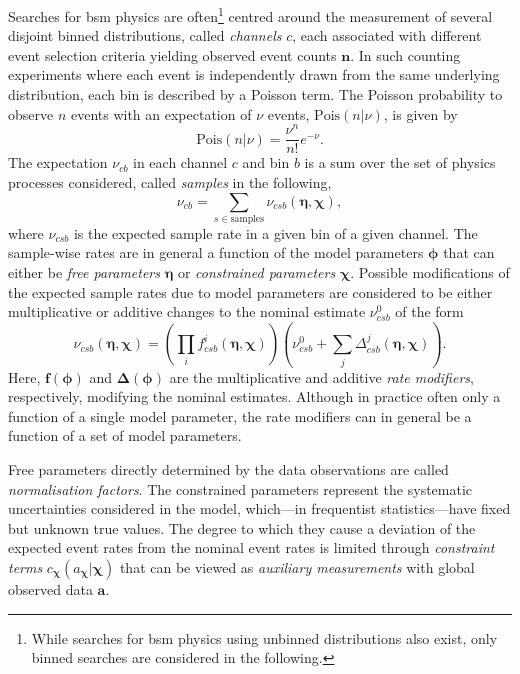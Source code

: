 Searches for \gls{bsm} physics are often\footnote{While searches for \gls{bsm} physics using unbinned distributions also exist, only binned searches are considered in the following.} centred around the measurement of several disjoint binned distributions, called \textit{channels} $c$, each associated with different event selection criteria yielding observed event counts $\boldsymbol{n}$.
In such counting experiments where each event is independently drawn from the same underlying distribution, each bin is described by a Poisson term.
The Poisson probability to observe $n$ events with an expectation of $\nu$ events, $\mathrm{Pois}(n\vert\nu)$, is given by
\begin{equation}
	\mathrm{Pois}(n\vert\nu) = \frac{\nu^n}{n!}e^{-\nu}.
\end{equation}
The expectation $\nu_{cb}$ in each channel $c$ and bin $b$ is a sum over the set of physics processes considered, called \textit{samples} in the following, 
\begin{equation}
	\nu_{cb} = \sum_{s\in\mathrm{samples}}\nu_{csb}(\boldsymbol{\eta},\boldsymbol{\chi}),
\end{equation}
where $\nu_{csb}$ is the expected sample rate in a given bin of a given channel. The sample-wise rates are in general a function of the model parameters $\boldsymbol{\phi}$ that can either be \textit{free parameters} $\boldsymbol{\eta}$ or \textit{constrained parameters} $\boldsymbol{\chi}$. Possible modifications of the expected sample rates due to model parameters are considered to be either multiplicative or additive changes to the nominal estimate $\nu_{csb}^0$ of the form
\begin{equation}
	\nu_{csb}(\boldsymbol{\eta},\boldsymbol{\chi}) = \left(\prod_i f^i_{csb}(\boldsymbol{\eta},\boldsymbol{\chi}) \right)\left(\nu^0_{csb} + \sum_j {\Delta^j_{csb}(\boldsymbol{\eta},\boldsymbol{\chi})} \right).
\end{equation}
Here, $\boldsymbol{f}(\boldsymbol{\phi})$ and $\boldsymbol{\Delta}(\boldsymbol{\phi})$ are the multiplicative and additive \textit{rate modifiers}, respectively, modifying the nominal estimates. Although in practice often only a function of a single model parameter, the rate modifiers can in general be a function of a set of model parameters.

Free parameters directly determined by the data observations are called \textit{normalisation factors}.
The constrained parameters represent the systematic uncertainties considered in the model, which---in frequentist statistics---have fixed but unknown true values.
The degree to which they cause a deviation of the expected event rates from the nominal event rates is limited through \textit{constraint terms} $c_{\boldsymbol{\chi}}(a_{\boldsymbol{\chi}}\vert\boldsymbol{\chi})$ that can be viewed as \textit{auxiliary measurements} with global observed data $\boldsymbol{a}$. 

